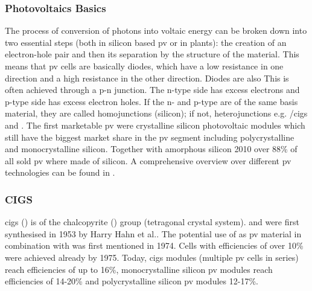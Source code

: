 \subsubsection{Photovoltaics Basics}
The process of conversion of photons into voltaic energy can be broken down into two essential steps (both in silicon based \gls{pv} or in plants): 
the creation of an electron-hole pair and then its separation by the structure of the material.\cite{markvart2013principles}
This means that \gls{pv} cells are basically diodes, which have a low resistance in one direction and a high resistance in the other direction. Diodes are also 
This is often achieved through a p-n junction.
The n-type side has excess electrons and p-type side has excess electron holes. 
If the n- and p-type are of the same basis material, they are called homojunctions (silicon); if not, heterojunctions e.g. /\gls{cigs} and .\cite{breitenstein2013understanding}
%
The first marketable \gls{pv} were crystalline silicon photovoltaic modules which still have the biggest market share in the \gls{pv} segment including polycrystalline and monocrystalline silicon.
Together with amorphous silicon 2010 over 88\% of all sold \gls{pv} where made of silicon\cite{breitenstein2013understanding}.
A comprehensive overview over different \gls{pv} technologies can be found in \cite{markvart2013principles}.


\subsubsection{CIGS}
\gls{cigs} () is of the chalcopyrite () group (tetragonal crystal system). 
 and  were first synthesised in 1953 by Harry Hahn et al.\cite{hahn1953untersuchungen}.
The potential use of  as \gls{pv} material in combination with  was first mentioned in 1974\cite{wagner1974cuinse2}.
Cells with efficiencies of over 10\% were achieved already by 1975.\cite{kazmerski1976thin}
Today, 
\gls{cigs} modules (multiple \gls{pv} cells in series) 
reach efficiencies of up to 16\%\cite{feurer2017cigs},
monocrystalline silicon \gls{pv} modules reach efficiencies of 14-20\%
and polycrystalline silicon \gls{pv} modules 12-17\%\cite{mcevoy2011practical}.

